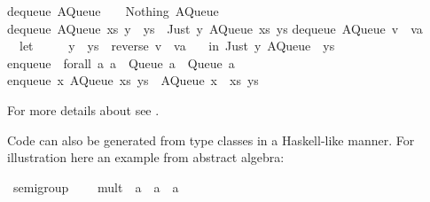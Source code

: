 \begin{isabellebody}
\begin{isamarkuptext}
dequeue\ {\isacharparenleft}AQueue\ {\isacharbrackleft}{\isacharbrackright}\ {\isacharbrackleft}{\isacharbrackright}{\isacharparenright}\ {\isacharequal}\ {\isacharparenleft}Nothing{\isacharcomma}\ AQueue\ {\isacharbrackleft}{\isacharbrackright}\ {\isacharbrackleft}{\isacharbrackright}{\isacharparenright}{\isacharsemicolon}\isanewline
dequeue\ {\isacharparenleft}AQueue\ xs\ {\isacharparenleft}y\ {\isacharcolon}\ ys{\isacharparenright}{\isacharparenright}\ {\isacharequal}\ {\isacharparenleft}Just\ y{\isacharcomma}\ AQueue\ xs\ ys{\isacharparenright}{\isacharsemicolon}\isanewline
dequeue\ {\isacharparenleft}AQueue\ {\isacharparenleft}v\ {\isacharcolon}\ va{\isacharparenright}\ {\isacharbrackleft}{\isacharbrackright}{\isacharparenright}\ {\isacharequal}\isanewline
\ \ let\ {\isacharbraceleft}\isanewline
\ \ \ \ {\isacharparenleft}y\ {\isacharcolon}\ ys{\isacharparenright}\ {\isacharequal}\ reverse\ {\isacharparenleft}v\ {\isacharcolon}\ va{\isacharparenright}{\isacharsemicolon}\isanewline
\ \ {\isacharbraceright}\ in\ {\isacharparenleft}Just\ y{\isacharcomma}\ AQueue\ {\isacharbrackleft}{\isacharbrackright}\ ys{\isacharparenright}{\isacharsemicolon}\isanewline
\isanewline
enqueue\ {\isacharcolon}{\isacharcolon}\ forall\ a{\isachardot}\ a\ {\isacharminus}{\isachargreater}\ Queue\ a\ {\isacharminus}{\isachargreater}\ Queue\ a{\isacharsemicolon}\isanewline
enqueue\ x\ {\isacharparenleft}AQueue\ xs\ ys{\isacharparenright}\ {\isacharequal}\ AQueue\ {\isacharparenleft}x\ {\isacharcolon}\ xs{\isacharparenright}\ ys{\isacharsemicolon}\isanewline
\isanewline
{\isacharbraceright}\isanewline%
\end{isamarkuptext}%
\isamarkuptrue%
%
\endisatagquotetypewriter
{\isafoldquotetypewriter}%
%
\isadelimquotetypewriter
%
\endisadelimquotetypewriter
%
\begin{isamarkuptext}%
\noindent For more details about \hyperlink{command.export-code}{\mbox{}} see
  .%
\end{isamarkuptext}%
\isamarkuptrue%
%
\isamarkuptrue%
%
\begin{isamarkuptext}%
Code can also be generated from type classes in a Haskell-like
  manner.  For illustration here an example from abstract algebra:%
\end{isamarkuptext}%
\isamarkuptrue%
%
\isadelimquote
%
\endisadelimquote
%
\isatagquote
{}\isamarkupfalse%
\ semigroup\ {\isacharequal}\isanewline
\ \ \ mult\ {\isacharcolon}{\isacharcolon}\ {\isachardoublequoteopen}{\isacharprime}a\ {\isasymRightarrow}\ {\isacharprime}a\ {\isasymRightarrow}\ {\isacharprime}a{\isachardoublequoteclose}\ {\isacharparenleft}\ {\isachardoublequoteopen}{\isasymotimes}{\isachardoublequoteclose}\ {}{}{\isacharparenright}\isanewline

\end{isabellebody}
